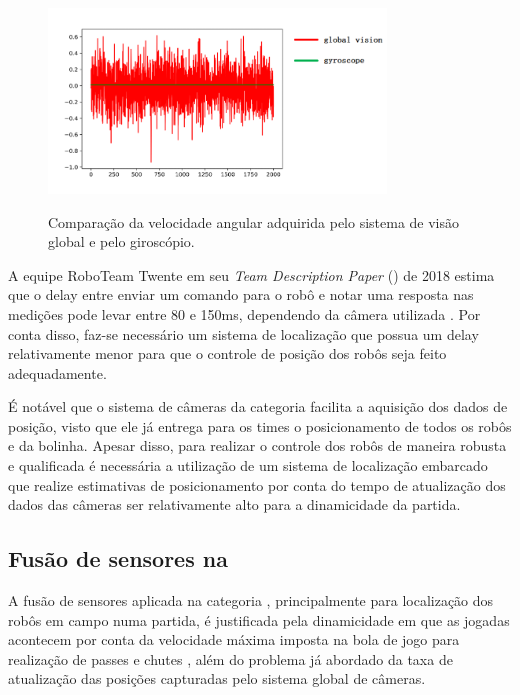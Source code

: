 \documentclass[acronym, symbols, table, deposito]{fei}
\begin{document}
			\begin{figure}[!htb]
					\centering
					\caption{Comparação da velocidade angular adquirida pelo sistema de visão global e pelo giroscópio.} 
					\includegraphics[width=0.8\textwidth]{Comparacao_cameras_giroscopio.png}
					\label{fig:comparison_cameras_gyroscope}
				\end{figure}
		
			A equipe RoboTeam Twente em seu \textit{Team Description Paper} () de 2018 estima que o delay entre enviar um comando para o robô e notar uma resposta nas medições pode levar entre 80 e 150ms, dependendo da câmera utilizada \cite{tdptwente2018}. Por conta disso, faz-se necessário um sistema de localização que possua um delay relativamente menor para que o controle de posição dos robôs seja feito adequadamente.
			
			É notável que o sistema de câmeras da categoria  facilita a aquisição dos dados de posição, visto que ele já entrega para os times o posicionamento de todos os robôs e da bolinha. Apesar disso, para realizar o controle dos robôs de maneira robusta e qualificada é necessária a utilização de um sistema de localização embarcado que realize estimativas de posicionamento por conta do tempo de atualização dos dados das câmeras ser relativamente alto para a dinamicidade da partida.
			
			\subsection{Fusão de sensores na } \label{sec:fusao_sensores_ssl}
			
				A fusão de sensores aplicada na categoria , principalmente para localização dos robôs em campo numa partida, é justificada pela dinamicidade em que as jogadas acontecem por conta da velocidade máxima imposta na bola de jogo para realização de passes e chutes \cite{rules}, além do problema já abordado da taxa de atualização das posições capturadas pelo sistema global de câmeras.
				
\end{document}
